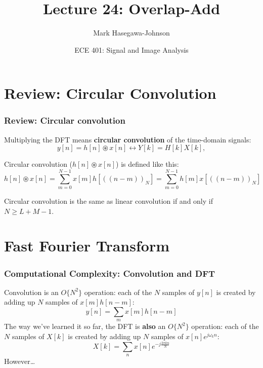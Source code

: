 \documentclass{beamer}
\title{Lecture 24: Overlap-Add}
\author{Mark Hasegawa-Johnson}
\date{ECE 401: Signal and Image Analysis}
\begin{document}
\begin{frame}
  \maketitle
\end{frame}

\begin{frame}
  \tableofcontents
\end{frame}

\section[Review]{Review: Circular Convolution}
\setcounter{subsection}{1}

\begin{frame}
  \frametitle{Review: Circular convolution}

  Multiplying the DFT means {\bf circular convolution} of the time-domain signals:
  \begin{displaymath}
    y[n]=h[n]\circledast x[n] \leftrightarrow Y[k] = H[k]X[k],
  \end{displaymath}
  
  Circular convolution ($h[n]\circledast x[n]$) is defined like this:
  \begin{displaymath}
    h[n]\circledast x[n] = \sum_{m=0}^{N-1}x[m]h\left[(\!(n-m)\!)_N\right]
    = \sum_{m=0}^{N-1}h[m]x\left[(\!(n-m)\!)_N\right]
  \end{displaymath}

  Circular convolution is the same as linear convolution if and only if $N\ge L+M-1$.
\end{frame}

\section[FFT]{Fast Fourier Transform}
\setcounter{subsection}{1}

\begin{frame}
  \frametitle{Computational Complexity: Convolution and DFT}

  Convolution is an $O\{N^2\}$ operation: each of the $N$ samples of
  $y[n]$ is created by adding up $N$ samples of $x[m]h[n-m]$:
  \begin{displaymath}
    y[n] = \sum_m x[m] h[n-m]
  \end{displaymath}
  The way we've learned it so far, the DFT is {\bf also} an $O\{N^2\}$
  operation: each of the $N$ samples of $X[k]$ is created by adding up
  $N$ samples of $x[n]e^{j\omega_k n}$:
  \begin{displaymath}
    X[k] = \sum_n x[n] e^{-j\frac{2\pi kn}{N}}
  \end{displaymath}
  However\ldots
\end{frame}
\end{document}
